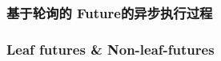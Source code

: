 \begin{frame}[fragile]
    \frametitle{基于轮询的 Future的异步执行过程}
% 
% 
% 
\end{frame}
\begin{frame}[fragile]
    \frametitle{Leaf futures \& Non-leaf-futures}
% 
% 
% 
% 
% 
% 
% 
\end{frame}
